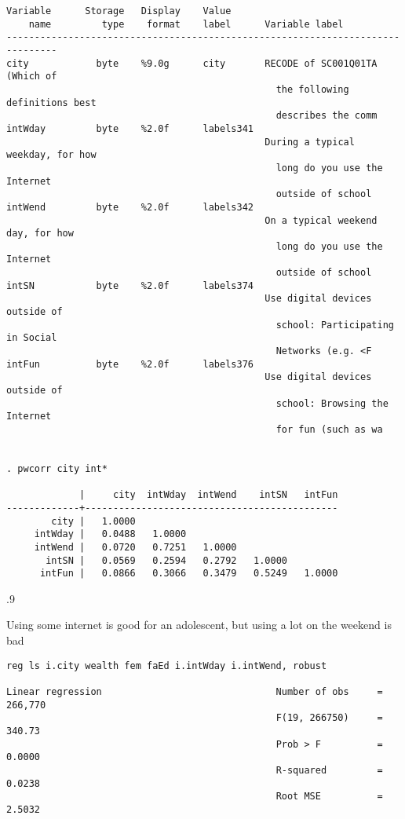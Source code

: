 \documentclass[10pt, letterpaper]{article}
\begin{document}
\begin{spacing}{1.4}
\begin{spacing}{.5}
\begin{scriptsize}
\begin{verbatim}
Variable      Storage   Display    Value
    name         type    format    label      Variable label
-------------------------------------------------------------------------------
city            byte    %9.0g      city       RECODE of SC001Q01TA (Which of
                                                the following definitions best
                                                describes the comm
intWday         byte    %2.0f      labels341
                                              During a typical weekday, for how
                                                long do you use the Internet
                                                outside of school
intWend         byte    %2.0f      labels342
                                              On a typical weekend day, for how
                                                long do you use the Internet
                                                outside of school
intSN           byte    %2.0f      labels374
                                              Use digital devices outside of
                                                school: Participating in Social
                                                Networks (e.g. <F
intFun          byte    %2.0f      labels376
                                              Use digital devices outside of
                                                school: Browsing the Internet
                                                for fun (such as wa


. pwcorr city int*

             |     city  intWday  intWend    intSN   intFun
-------------+---------------------------------------------
        city |   1.0000 
     intWday |   0.0488   1.0000 
     intWend |   0.0720   0.7251   1.0000 
       intSN |   0.0569   0.2594   0.2792   1.0000 
      intFun |   0.0866   0.3066   0.3479   0.5249   1.0000 
\end{verbatim}
\end{scriptsize}
\end{spacing}{.9}

Using some internet is good for an adolescent, but using a lot on the weekend is bad


\begin{spacing}{.5}
\begin{scriptsize}
\begin{verbatim}
reg ls i.city wealth fem faEd i.intWday i.intWend, robust

Linear regression                               Number of obs     =    266,770
                                                F(19, 266750)     =     340.73
                                                Prob > F          =     0.0000
                                                R-squared         =     0.0238
                                                Root MSE          =     2.5032


\end{verbatim}
\end{scriptsize}
\end{spacing}
\end{spacing}
\end{document}
